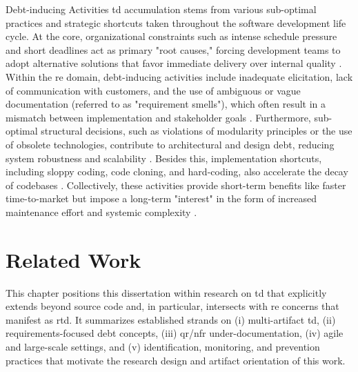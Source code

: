 \documentclass[12pt,reqno, twoside]{amsbook}
\makeatletter
\def\subsection{\@startsection{subsection}{2}%
      \z@{.5\linespacing\@plus.7\linespacing}{.25\linespacing}%
      {\normalfont\bfseries\flushleft}}
\theoremstyle{plain}
\numberwithin{equation}{chapter}
\numberwithin{section}{chapter}
\makeatother
\begin{document}
\subsection{Debt-inducing Activities}
\noindent \gls{td} accumulation stems from various sub-optimal practices and strategic shortcuts taken throughout the 
software development life cycle. At the core, organizational constraints such as intense schedule pressure and short deadlines act 
as primary "root causes," forcing development teams to adopt alternative solutions that favor immediate delivery over internal 
quality \parencite{Alenazi2025, Alfayez2018}.
Within the \gls{re} domain, debt-inducing activities include inadequate elicitation, lack of communication with customers, and the 
use of ambiguous or vague documentation (referred to as "requirement smells"), which often result in a mismatch between 
implementation and stakeholder goals \parencite{Alfayez2018, AlOmar2022}. Furthermore, sub-optimal structural decisions, such as 
violations of modularity principles or the use of obsolete technologies, contribute to architectural and design debt, reducing 
system robustness and scalability \parencite{Alfayez2018, Aljohani2025}. Besides this, implementation shortcuts, including sloppy 
coding, code cloning, and hard-coding, also accelerate the decay of codebases \parencite{Alfayez2018, Aljohani2025}. Collectively, 
these activities provide short-term benefits like faster time-to-market but impose a long-term "interest" in the form of increased 
maintenance effort and systemic complexity \parencite{Alfayez2018, Aljohani2025}.

\chapter{Related Work}
\noindent This chapter positions this dissertation within research on \gls{td} that explicitly extends beyond source code and, in particular, intersects with \gls{re} concerns that manifest as \gls{rtd}. It summarizes established strands on (i) multi-artifact \gls{td}, (ii) requirements-focused debt concepts, (iii) \gls{qr}/\gls{nfr} under-documentation, (iv) agile and large-scale settings, and (v) identification, monitoring, and prevention practices that motivate the research design and artifact orientation of this work.
\end{document}
